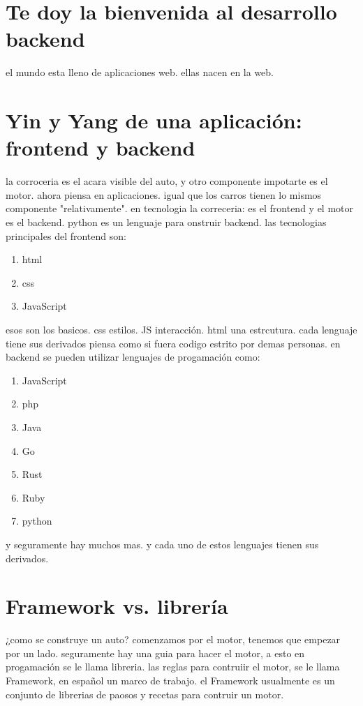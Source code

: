 \documentclass{article}
\begin{document}
    

    \section{Te doy la bienvenida al desarrollo backend}
    el mundo esta lleno de aplicaciones web. ellas nacen en la web. 
    \section{Yin y Yang de una aplicación: frontend y backend}
    la corroceria es el acara visible del auto, y otro componente impotarte es el motor.
    ahora piensa en aplicaciones. igual que los carros tienen lo mismos componente "relativamente".
    en tecnologia la correceria: es el frontend y el motor es el backend.
    python es un lenguaje para onstruir backend. las tecnologias principales del frontend son: 
    \begin{enumerate}
        \item html
        \item css
        \item JavaScript
    \end{enumerate}
    esos son los basicos. css estilos. JS interacción. html una estrcutura.
    cada lenguaje tiene sus derivados piensa como si fuera codigo estrito por demas personas.
    en backend se pueden utilizar lenguajes de progamación como:
    \begin{enumerate}
        \item JavaScript
        \item php 
        \item Java
        \item Go
        \item Rust
        \item Ruby
        \item python
    \end{enumerate}
    y seguramente hay muchos mas. y cada uno de estos lenguajes tienen sus derivados.
    \section{Framework vs. librería}
    ¿como se construye un auto? comenzamos por el motor, tenemos que empezar por un lado.
    seguramente hay una guia para hacer el motor, a esto en progamación se le llama libreria.
    las reglas para contruiir el motor, se le llama Framework, en español un marco de trabajo.
    el Framework usualmente es un conjunto de librerias de paosos y recetas para contruir un motor.
\end{document}
